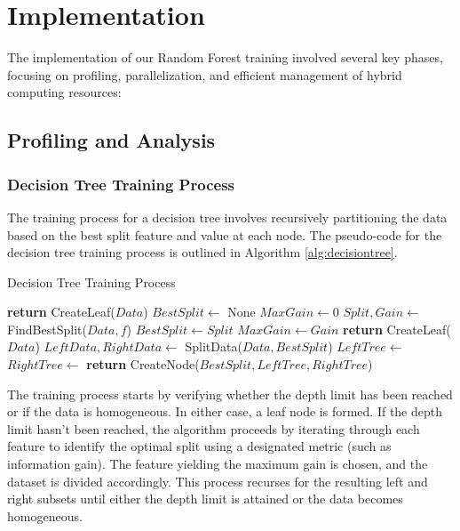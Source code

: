 \documentclass[13pt]{article}
\begin{document}
\section{Implementation}
The implementation of our Random Forest training involved several key phases, focusing on profiling, parallelization, and efficient management of hybrid computing resources:

\subsection{Profiling and Analysis}

\subsubsection{Decision Tree Training Process}
The training process for a decision tree involves recursively partitioning the data based on the best split feature and value at each node.
The pseudo-code for the decision tree training process is outlined in Algorithm \ref{alg:decisiontree}.

\begin{algorithm}[h!]
    \caption{Decision Tree Training Process}\label{alg:decisiontree}
    \begin{algorithmic}[1]
            \State \textbf{return} CreateLeaf($Data$)
        \EndIf
        \State $BestSplit \gets$ None
        \State $MaxGain \gets 0$
            \State $Split, Gain \gets$ FindBestSplit($Data, f$)
                \State $BestSplit \gets Split$
                \State $MaxGain \gets Gain$
            \EndIf
        \EndFor
            \State \textbf{return} CreateLeaf($Data$)
        \EndIf
        \State $LeftData, RightData \gets$ SplitData($Data, BestSplit$)
        \State $LeftTree \gets$ 
        \State $RightTree \gets$ 
        \State \textbf{return} CreateNode($BestSplit, LeftTree, RightTree$)
    \EndProcedure
    \end{algorithmic}
\end{algorithm}

The training process starts by verifying whether the depth limit has been reached or if the data is homogeneous. In either case, a leaf node is formed. If the depth limit hasn't been reached, the algorithm proceeds by iterating through each feature to identify the optimal split using a designated metric (such as information gain). The feature yielding the maximum gain is chosen, and the dataset is divided accordingly. This process recurses for the resulting left and right subsets until either the depth limit is attained or the data becomes homogeneous.
\end{document}
